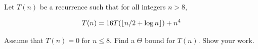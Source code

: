 \documentclass[12pt,oneside]{article}
\begin{document}
\insolutions{\vspace{0.3in}}
\begin{problem}{10}
Let $T(n)$ be a recurrence such that for all integers $n > 8$,

$$T(n) = 16T(\left\lfloor n/2+\log{n}\right\rfloor) + n^{4}$$

Assume that $T(n) = 0$ for $n \leq 8$.  Find a $\Theta$ bound for $T(n)$.  Show your work.


\end{problem}

%
\end{document}
